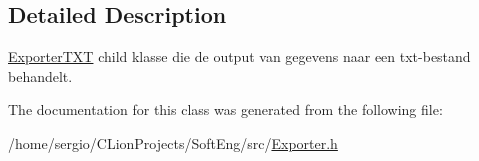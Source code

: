\subsection{Detailed Description}
\hyperlink{class_exporter_t_x_t}{Exporter\+T\+XT} child klasse die de output van gegevens naar een txt-\/bestand behandelt. 

The documentation for this class was generated from the following file\+:\begin{DoxyCompactItemize}
\item 
/home/sergio/\+C\+Lion\+Projects/\+Soft\+Eng/src/\hyperlink{_exporter_8h}{Exporter.\+h}\end{DoxyCompactItemize}

